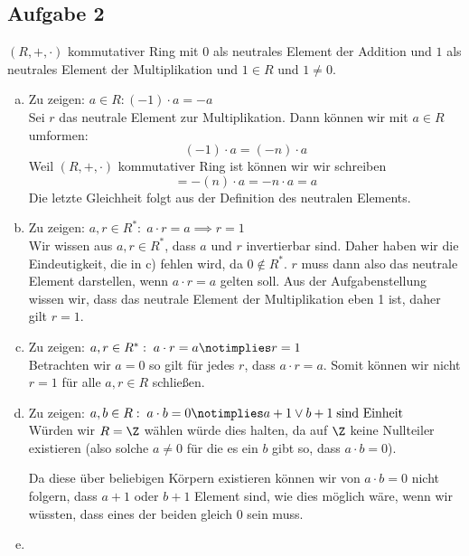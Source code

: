 \subsection*{Aufgabe 2}
$(R, +, \cdot)$ kommutativer Ring mit $0$ als neutrales Element der Addition und $1$ als neutrales Element der Multiplikation und $1 \in R$ und $1 \neq 0$.

\begin{enumerate}[a)]
  \item Zu zeigen: $a \in R: (-1) \cdot a = -a$ \\

  Sei $r$ das neutrale Element zur Multiplikation. Dann können wir mit $a \in R$ umformen:
  \[ (-1) \cdot a = (-n) \cdot a \]
  Weil $(R, +, \cdot)$ kommutativer Ring ist können wir wir schreiben
  \[
    = -(n) \cdot a = -n \cdot a = a
  \]
  Die letzte Gleichheit folgt aus der Definition des neutralen Elements.

  \item Zu zeigen: $  a,r \in R^{*}: \; a \cdot r = a \implies r = 1$ \\

  Wir wissen aus $a, r \in R^{*}$, dass $a$ und $r$ invertierbar sind. Daher haben wir die Eindeutigkeit, die in c) fehlen wird, da $0 \notin R^{*}$. $r$ muss dann also das neutrale Element darstellen, wenn $a \cdot r = a$ gelten soll. Aus der Aufgabenstellung wissen wir, dass das neutrale Element der Multiplikation eben 1 ist, daher gilt $r=1$.

  \item Zu zeigen: $  a,r \in R^{*}: \; a \cdot r = a \notimplies r = 1$ \\

  Betrachten wir $a=0$ so gilt für jedes $r$, dass $a \cdot r = a$. Somit können wir nicht $r=1$ für alle $a, r \in R$ schließen.

  \item Zu zeigen: $a, b \in R: \; a \cdot b = 0 \notimplies a + 1 \lor b+1 \; \text{sind Einheit}$ \\

  Würden wir $R = \Z$ wählen würde dies halten, da auf $\Z$ keine Nullteiler existieren (also solche $a \neq 0$ für die es ein $b$ gibt so, dass $a \cdot b = 0$).

  Da diese über beliebigen Körpern existieren können wir von $a \cdot b = 0$ nicht folgern, dass $a+1$ oder $b+1$ Element sind, wie dies möglich wäre, wenn wir wüssten, dass eines der beiden gleich 0 sein muss.

  \item





\end{enumerate}